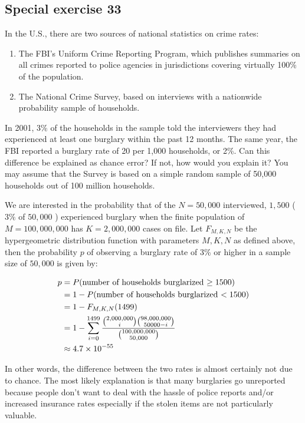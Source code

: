 \documentclass[11pt]{article}
\begin{document}
\subsection*{Special exercise 33} %
In the U.S., there are two sources of national statistics on crime rates:
\begin{enumerate}[i]
	\item The FBI's Uniform Crime Reporting Program, which publishes summaries on all crimes reported to police agencies in jurisdictions covering virtually 100\% of the population.
	\item The National Crime Survey, based on interviews with a nationwide probability sample of households.
\end{enumerate}

In 2001, 3\% of the households in the sample told the interviewers they had experienced at least one burglary within the past 12 months.
The same year, the FBI reported a burglary rate of 20 per 1,000 households, or 2\%.
Can this difference be explained as chance error?
If not, how would you explain it?
You may assume that the Survey is based on a simple random sample of 50,000 households out of 100 million households.

We are interested in the probability that of the $ N = 50,000 $ interviewed, $ 1,500 $ ($ 3\% $ of $ 50,000 $ ) experienced burglary when the finite population of $ M = 100,000,000 $ has $ K = 2,000,000 $ cases on file.  Let $ F_{M, K, N} $ be the hypergeometric distribution function with parameters $ M,K,N $ as defined above, then the probability $ p $ of observing a burglary rate of 3\% or higher in a sample size of $ 50,000 $ is given by:

\begin{align*}
p &= P(\text{number of households burglarized $ \geq 1500 $}) \\
&= 1- P(\text{number of households burglarized $ < 1500 $}) \\
&= 1- F_{M, K, N}(1499) \\
&= 1-\sum_{i=0}^{1499} \dfrac{\binom{2,000,000}{i} \binom{98,000,000}{50000-i}}{\binom{100,000,000}{50,000}} \\
&\approx 4.7 \times 10^{-55}
\end{align*} 

In other words, the difference between the two rates is almost certainly not due to chance.  The most likely explanation is that many burglaries go unreported because people don't want to deal with the hassle of police reports and/or increased insurance rates especially if the stolen items are not particularly valuable.
\end{document}
